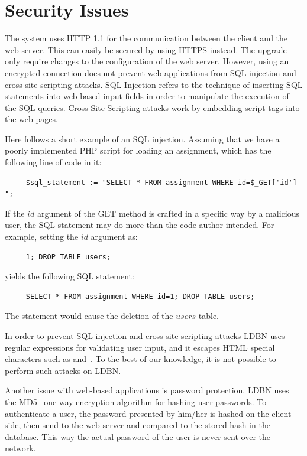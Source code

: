\section{Security Issues}
The system uses HTTP 1.1 for the communication between the client and the web
server. This can easily be secured by using HTTPS instead. The upgrade only
require changes to the configuration of the web server. However, using an encrypted
connection does not prevent web applications from SQL injection and cross-site 
scripting attacks. SQL Injection refers to the technique of 
inserting SQL statements into web-based input fields in 
order to manipulate the execution of the SQL queries. Cross Site Scripting 
attacks work by embedding script tags into the web pages. 

Here follows a short example of an SQL injection.
Assuming that we have a poorly implemented PHP script for loading an assignment,
which has the following line of code in it:

\begin{verbatim}
     $sql_statement := "SELECT * FROM assignment WHERE id=$_GET['id'] ";
\end{verbatim}

\noindent If the $id$ argument of the GET method is crafted in a specific way by a 
malicious user, the SQL statement may do more than the code author intended. 
For example, setting the $id$ argument as:

\begin{verbatim}
     1; DROP TABLE users;
\end{verbatim}

\noindent yields the following SQL statement:

\begin{verbatim}
     SELECT * FROM assignment WHERE id=1; DROP TABLE users;
\end{verbatim}

\noindent The statement would cause the deletion of the $users$ table. 

In order to prevent SQL injection and cross-site 
scripting attacks LDBN uses regular expressions for validating
user input, and it escapes HTML special characters such as \lt and~\gt.
To the best of our knowledge, it is not possible to perform such attacks on LDBN.

Another issue with web-based applications is password protection. LDBN uses the 
MD5~\cite{w7} one-way encryption algorithm for hashing user passwords. 
To authenticate a user, the password presented by him/her is hashed on the client side, 
then send to the web server and compared to the stored hash in the database. 
This way the actual password of the user is never sent over the network.
